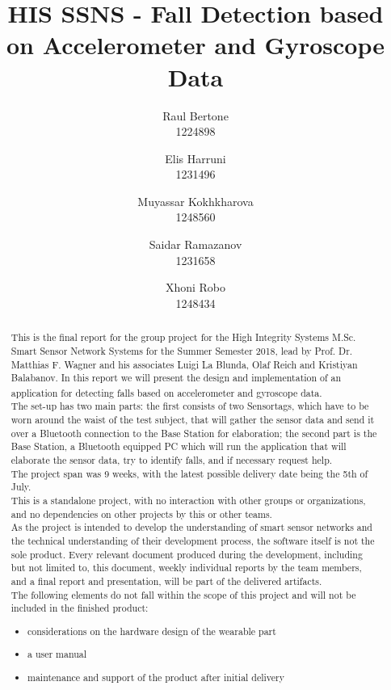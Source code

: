 \documentclass[hidelinks,conference,12pt]{IEEETran}
\title{HIS SSNS - Fall Detection based on Accelerometer and Gyroscope Data}
\author{
	 Raul Bertone \\ 1224898
\and Elis Harruni \\ 1231496
\and Muyassar Kokhkharova \\ 1248560
\and Saidar Ramazanov \\ 1231658
\and Xhoni Robo \\ 1248434
}
\begin{document}
\maketitle

\begin{abstract}

This is the final report for the group project for the High Integrity Systems M.Sc. Smart Sensor Network Systems for the Summer Semester 2018, lead by Prof. Dr. Matthias F. Wagner and his associates Luigi La Blunda, Olaf Reich and Kristiyan Balabanov. In this report we will present the design and implementation of an application for detecting falls based on accelerometer and gyroscope data\textsuperscript{\cite{lablunda}}.\\
The set-up has two main parts: the first consists of two Sensortags, which have to be worn around the waist of the test subject, that will gather the sensor data and send it over a Bluetooth connection to the Base Station for elaboration; the second part is the Base Station, a Bluetooth equipped PC which will run the application that will elaborate the sensor data, try to identify falls, and if necessary request help.\\
The project span was 9 weeks, with the latest possible delivery date being the 5th of July.\\
This is a standalone project, with no interaction with other groups or organizations, and no dependencies on other projects by this or other teams.\\
As the project is intended to develop the understanding of smart sensor networks and the technical understanding of their development process, the software itself is not the sole product. Every relevant document produced during the development, including but not limited to, this document, weekly individual reports by the team members, and a final report and presentation, will be part of the delivered artifacts.\\
The following elements do not fall within the scope of this project and will not be included in the finished product:
\begin{itemize}
	\item considerations on the hardware design of the wearable part
	\item a user manual
	\item maintenance and support of the product after initial delivery
\end{itemize}	
\end{abstract}
\end{document}
